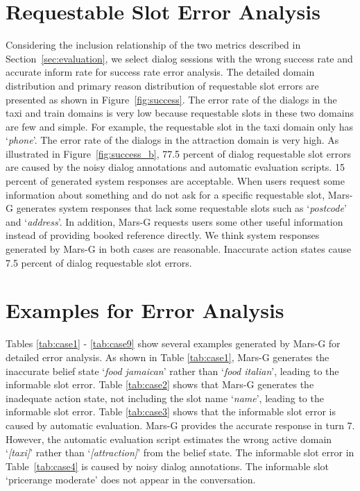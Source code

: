 \section{Requestable Slot Error Analysis}
\label{app:req_error}
Considering the inclusion relationship of the two metrics described in Section~\ref{sec:evaluation}, we  select dialog sessions with the wrong success rate and accurate inform rate for success rate error analysis.
The detailed domain distribution and primary  reason  distribution of requestable slot errors are presented as shown in Figure~\ref{fig:success}.  The error rate of the dialogs in the taxi and train domains is very low because requestable slots in these two domains are few and simple.  For example, the requestable slot in the taxi domain only has `\textit{phone}'. The error rate of the dialogs in the attraction domain is very high. 
As illustrated  in Figure~\ref{fig:success_b}, 77.5 percent of dialog requestable slot errors are caused by  the noisy dialog annotations and automatic evaluation scripts. 15 percent of generated system responses are acceptable.
When users request some information about something and do not ask for a specific requestable slot, Mars-G generates system responses that lack some requestable slots such as `\textit{postcode}' and `\textit{address}'. In addition, Mars-G requests users some other useful information instead of providing booked reference directly. We think system responses generated by Mars-G in both cases are reasonable.
Inaccurate action states cause 7.5 percent of dialog requestable slot errors.

\section{Examples for Error Analysis}
\label{app:error}

Tables \ref{tab:case1} - \ref{tab:case9} show several examples generated by Mars-G for detailed error analysis. 
As shown in Table \ref{tab:case1},  Mars-G generates the inaccurate belief state `\textit{food jamaican}' rather than `\textit{food italian}', leading to the informable slot error. 
 Table \ref{tab:case2} shows that  Mars-G generates the inadequate  action state,  not including the slot name `\textit{name}', leading to the informable slot error. 
Table \ref{tab:case3} shows that the informable slot error is caused by automatic evaluation. Mars-G provides the accurate response in turn 7. However, the automatic evaluation script estimates the wrong active domain `\textit{[taxi]}' rather than `\textit{[attraction]}' from the belief state.
The informable slot error in Table~\ref{tab:case4}  is caused by noisy dialog annotations. The informable slot `pricerange moderate' does not appear in the conversation.

